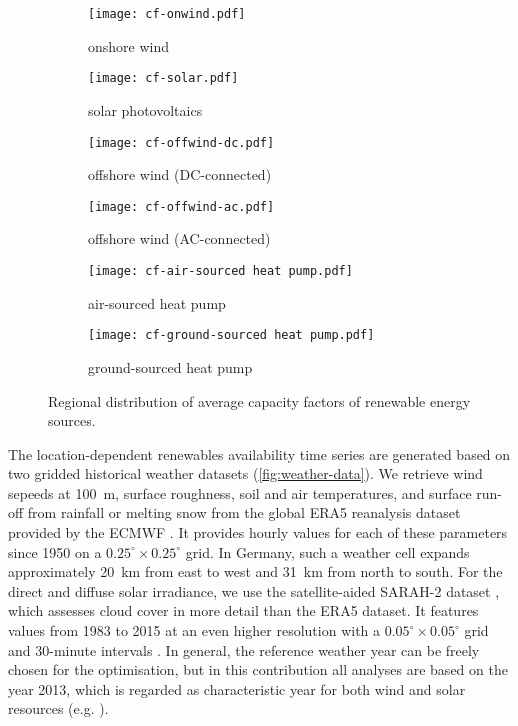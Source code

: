 \begin{figure}
    \centering
    \begin{subfigure}[t]{0.49\textwidth}
        \centering
        \caption{onshore wind}
        \texttt{[image: cf-onwind.pdf]}
    \end{subfigure}
    \begin{subfigure}[t]{0.49\textwidth}
        \centering
        \caption{solar photovoltaics}
        \texttt{[image: cf-solar.pdf]}
    \end{subfigure}
    \begin{subfigure}[t]{0.49\textwidth}
        \centering
        \caption{offshore wind (DC-connected)}
        \texttt{[image: cf-offwind-dc.pdf]}
    \end{subfigure}
    \begin{subfigure}[t]{0.49\textwidth}
        \centering
        \caption{offshore wind (AC-connected)}
        \texttt{[image: cf-offwind-ac.pdf]}
    \end{subfigure}
    \begin{subfigure}[t]{0.49\textwidth}
        \centering
        \caption{air-sourced heat pump}
        \texttt{[image: cf-air-sourced heat pump.pdf]}
    \end{subfigure}
    \begin{subfigure}[t]{0.49\textwidth}
        \centering
        \caption{ground-sourced heat pump}
        \texttt{[image: cf-ground-sourced heat pump.pdf]}
    \end{subfigure}
    \caption{Regional distribution of average capacity factors of renewable energy sources.}
    \label{fig:cfs-maps}
\end{figure}




The location-dependent renewables availability time series are generated based
on two gridded historical weather datasets (\cref{fig:weather-data}). We
retrieve wind sepeeds at \SI{100}{\metre}, surface roughness, soil and air
temperatures, and surface run-off from rainfall or melting snow from the global
ERA5 reanalysis dataset provided by the ECMWF . It provides hourly
values for each of these parameters since 1950 on a $0.25^{\circ} \times
0.25^{\circ}$ grid. In Germany, such a weather cell expands approximately
\SI{20}{\kilo\metre} from east to west and \SI{31}{km} from north to south. For
the direct and diffuse solar irradiance, we use the satellite-aided SARAH-2
dataset , which assesses cloud cover in more detail than the ERA5 dataset. It
features values from 1983 to 2015 at an even higher resolution with a
$0.05^{\circ} \times 0.05^{\circ}$ grid and 30-minute intervals . In
general, the reference weather year can be freely chosen for the optimisation,
but in this contribution all analyses are based on the year 2013, which is
regarded as characteristic year for both wind and solar resources (e.g.
).

